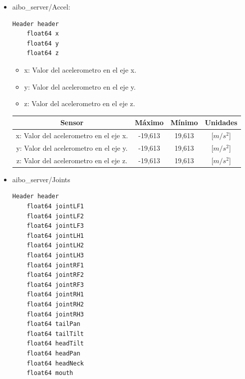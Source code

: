 \documentclass[12pt,a4paper,final,twoside]{book}
\begin{document}
\begin{itemize}
\item aibo{\_}server/Accel:

\begin{lstlisting}[language=bash]
	Header header
	float64 x
	float64 y
	float64 z
\end{lstlisting}
\begin{itemize}
\item x: Valor del acelerometro en el eje x.
\item y: Valor del acelerometro en el eje y.
\item z: Valor del acelerometro en el eje z.
\end{itemize}
\begin{table}[H]
\begin{center}
\begin{tabulary}{\textwidth}{|C|C|C|C|}
\hline
\textbf{Sensor}&\textbf{Máximo} & \textbf{Mínimo} & \textbf{Unidades} \\ \hline
 x: Valor del acelerometro en el eje x. & -19,613& 19,613& [$m/s^2$] \\ \hline
y: Valor del acelerometro en el eje y. & -19,613& 19,613& [$m/s^2$] \\ \hline
z: Valor del acelerometro en el eje z. & -19,613& 19,613& [$m/s^2$] \\ \hline

\end{tabulary}
\end{center}
\end{table}
\item aibo{\_}server/Joints
\begin{lstlisting}[language=bash]
	Header header
	float64 jointLF1
	float64 jointLF2     
	float64 jointLF3     
	float64 jointLH1     
	float64 jointLH2 
	float64 jointLH3 
	float64 jointRF1
	float64 jointRF2
	float64 jointRF3
	float64 jointRH1
	float64 jointRH2
	float64 jointRH3
	float64 tailPan
	float64 tailTilt
	float64 headTilt
	float64 headPan
	float64 headNeck
	float64 mouth

\end{lstlisting}


\end{itemize}
\end{document}
